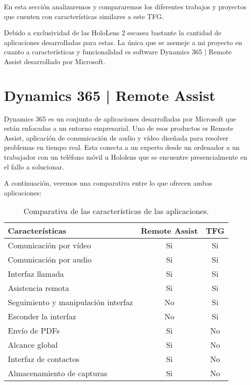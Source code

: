 
En esta sección analizaremos y compararemos los diferentes trabajos y proyectos que cuenten con características similares a este TFG.

Debido a exclusividad de las HoloLens 2 escasea bastante la cantidad de aplicaciones desarrolladas para estas. La única que se asemeje a mi proyecto en cuanto a características y funcionalidad es software Dynamics 365 | Remote Assist desarrollado por Microsoft.

\section{Dynamics 365 | Remote Assist}

Dynamics 365 \cite{microsoft:dynamics} es un conjunto de aplicaciones desarrolladas por Microsoft que están enfocadas a un entorno empresarial. Uno de esos productos es Remote Assist, aplicación de comunicación de audio y vídeo diseñada para resolver problemas en tiempo real. Esta conecta a un experto desde un ordenador a un trabajador con un teléfono móvil u Hololens que se encuentre presencialmente en el fallo a solucionar.

A continuación, veremos una comparativa entre lo que ofrecen ambas aplicaciones: 

\newpage


\begin{table}[t]
\centering
\begin{tabular}{|l|c|c|}
\toprule
Características & Remote Assist & TFG\\
\midrule
Comunicación por vídeo & \cellcolor{green!25} Si & \cellcolor{green!25} Si\\
Comunicación por audio & \cellcolor{green!25} Si & \cellcolor{green!25} Si\\
Interfaz llamada & \cellcolor{green!25} Si & \cellcolor{green!25} Si\\
Asistencia remota & \cellcolor{green!25} Si & \cellcolor{green!25} Si\\
Seguimiento y manipulación interfaz & \cellcolor{red!25} No & \cellcolor{green!25} Si\\
Esconder la interfaz & \cellcolor{red!25} No & \cellcolor{green!25} Si\\
Envío de PDFs & \cellcolor{green!25} Si & \cellcolor{red!25} No\\
Alcance global & \cellcolor{green!25} Si & \cellcolor{red!25} No\\
Interfaz de contactos & \cellcolor{green!25} Si & \cellcolor{red!25} No\\
Almacenamiento de capturas & \cellcolor{green!25} Si & \cellcolor{red!25} No\\

\bottomrule
\end{tabular}
\caption{Comparativa de las características de las aplicaciones.}
\label{comparativa-aplicaciones}
\end{table}

